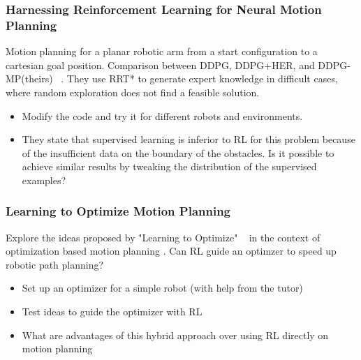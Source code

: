 \documentclass[a4paper]{article}
\begin{document}
\subsubsection{Harnessing Reinforcement Learning for Neural Motion Planning}
Motion planning for a planar robotic arm from a start configuration to a cartesian goal position. Comparison between DDPG, DDPG+HER, and DDPG-MP(theirs) ~\cite{Jurgenson2019}.
They use RRT* to generate expert knowledge in difficult cases, where random exploration does not find a feasible solution.
\begin{itemize}
    \item Modify the code and try it for different robots and environments.
    \item They state that supervised learning is inferior to RL for this problem because of the insufficient data on the boundary of the obstacles. Is it possible to achieve similar results by tweaking the distribution of the supervised examples?
\end{itemize}


\subsubsection{Learning to Optimize Motion Planning}
Explore the ideas proposed by "Learning to Optimize" ~\cite{LiM16b} in the context of optimization based motion planning \cite{Zucker2013}. Can RL guide an optimzer to speed up robotic path planning?

\begin{itemize}
    \item Set up an optimizer for a simple robot (with help from the tutor)
    \item Test ideas to guide the optimizer with RL
    \item What are advantages of this hybrid approach over using RL directly on motion planning
    \end{itemize}




\end{document}
